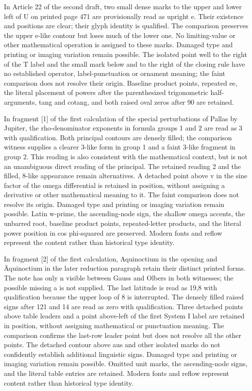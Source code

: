 In Article 22 of the second draft, two small dense marks to the upper and lower left of U on printed page 471 are provisionally read as upright e. Their existence and positions are clear; their glyph identity is qualified. The comparison preserves the upper e-like contour but loses much of the lower one. No limiting-value or other mathematical operation is assigned to these marks. Damaged type and printing or imaging variation remain possible. The isolated point well to the right of the T label and the small mark below and to the right of the closing rule have no established operator, label-punctuation or ornament meaning; the faint comparison does not resolve their origin. Baseline product points, repeated ee, the literal placement of powers after the parenthesized trigonometric half-arguments, tang and cotang, and both raised oval zeros after 90 are retained.

In fragment [1] of the first calculation of the special perturbations of Pallas by Jupiter, the rho-denominator exponents in formula groups 1 and 2 are read as 3 with qualification. Both principal contours are densely filled; the comparison witness supplies a clearer 3-like form in group 1 and a faint 3-like fragment in group 2. This reading is also consistent with the mathematical context, but is not an unambiguous direct reading of the principal. The retained reading 2 and the filled, 8-like appearance remain alternatives. A detached point above v in the sine factor of the omega differential is retained in position, without assigning a derivative or other mathematical meaning to it. The faint comparison does not resolve its origin. Damaged type and printing or imaging variation remain possible. Latin w-prime, the ascending-node sign, the shallow omega accents, the unbarred root, baseline product points, repeated-letter products, and the literal power position in cos phi-squared are preserved. Modern fonts and reflow represent the content rather than historical type identity.

In fragment [2] of the first calculation, Aquinoctium in the opening and Äquinoctium in the later reduction paragraph retain their distinct printed forms. The note has only n visible between Gauss and Olbers in both witnesses; the possible missing a is not supplied. The last latitude is read as 19,8 with qualification because the upper loop of 8 is interrupted. The densely filled raised signs after 121 and 14 are read as zero with qualification. Three detached points above table leaders and a point above-left of the first System I label are retained in position, without assigning mathematical or punctuation meaning. The comparison confirms the last-row leader point but does not resolve all the other points. The detached contour above aus and other isolated marks do not confidently establish additional linguistic signs. Damaged type and printing or imaging variation remain possible. Omitted unit marks, the ascending-node signs, and the literal table entries are retained. Modern fonts and reflow represent content rather than historical type identity.

